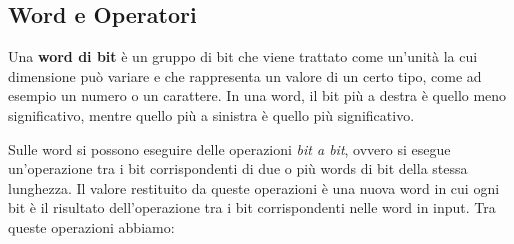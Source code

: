 \subsection{Word e Operatori}
\begin{definizione}
    Una \textbf{word di bit} è un gruppo di bit che viene trattato come un'unità
    la cui dimensione può variare e che rappresenta un valore di un certo tipo,
    come ad esempio un numero o un carattere. In una word, il bit più a destra è
    quello meno significativo, mentre quello più a sinistra è quello più significativo.
\end{definizione}
Sulle word si possono eseguire delle operazioni \textit{bit a bit}, ovvero si
esegue un'operazione tra i bit corrispondenti di due o più words di bit della
stessa lunghezza. Il valore restituito da queste operazioni è una nuova word in
cui ogni bit è il risultato dell'operazione tra i bit corrispondenti nelle word
in input. Tra queste operazioni abbiamo:
